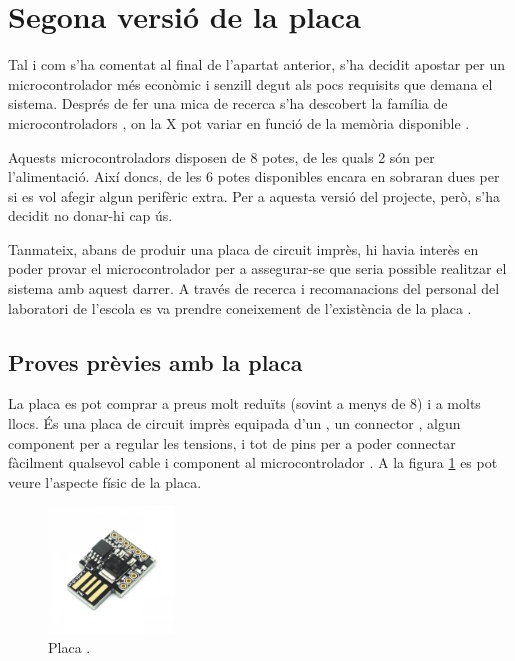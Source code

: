 \section{Segona versió de la placa}

Tal i com s'ha comentat al final de l'apartat anterior, s'ha decidit apostar
per un microcontrolador més econòmic i senzill degut als pocs requisits que
demana el sistema. Després de fer una mica de recerca s'ha descobert la
família de microcontroladors , on la X pot variar en funció de
la memòria  disponible \cite{AtTiny85}.

Aquests microcontroladors disposen de 8 potes, de les quals 2 són per
l'alimentació. Així doncs, de les 6 potes disponibles encara en sobraran dues
per si es vol afegir algun perifèric extra. Per a aquesta versió del projecte,
però, s'ha decidit no donar-hi cap ús.

Tanmateix, abans de produir una placa de circuit imprès, hi havia interès en
poder provar el microcontrolador per a assegurar-se que seria possible
realitzar el sistema amb aquest darrer. A través de recerca i recomanacions del
personal del laboratori de l'escola es va prendre coneixement de l'existència de
la placa .

\subsection{Proves prèvies amb la placa }
\label{subsec:hw_digispark}

La placa  es pot comprar a preus molt reduïts (sovint a menys de 
\SI[round-mode=places,round-precision=0]{8}{\EUR}) i a molts llocs.
És una placa de circuit imprès equipada d'un , un connector
, algun component per a regular les tensions, i tot de pins per a
poder connectar fàcilment qualsevol cable i component al microcontrolador
\cite{Digispark}. A la figura \ref{fig:digispark} es pot veure l'aspecte físic
de la placa.

\begin{figure}[ht]
    \centering
    \includegraphics[width=0.3\textwidth]{images/modules/digisparkimg.png}
    \caption{Placa  \cite{Digispark}.}
    \label{fig:digispark}
\end{figure}

